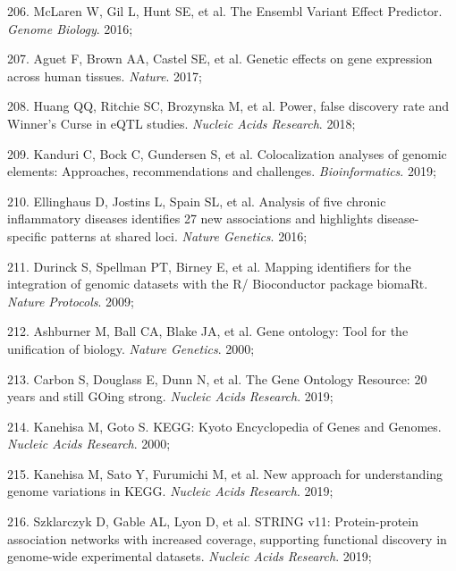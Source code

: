 \documentclass[11pt,oneside]{bristolthesis}
\newenvironment{cslreferences}%
  {}%
  {\par}
\begin{document}
\begin{cslreferences}
\leavevmode\hypertarget{ref-McLaren2016}{}%
206. McLaren W, Gil L, Hunt SE, et al. The Ensembl Variant Effect Predictor. \emph{Genome Biology}. 2016;

\leavevmode\hypertarget{ref-Aguet2017}{}%
207. Aguet F, Brown AA, Castel SE, et al. Genetic effects on gene expression across human tissues. \emph{Nature}. 2017;

\leavevmode\hypertarget{ref-Huang2018}{}%
208. Huang QQ, Ritchie SC, Brozynska M, et al. Power, false discovery rate and Winner's Curse in eQTL studies. \emph{Nucleic Acids Research}. 2018;

\leavevmode\hypertarget{ref-Kanduri2019}{}%
209. Kanduri C, Bock C, Gundersen S, et al. Colocalization analyses of genomic elements: Approaches, recommendations and challenges. \emph{Bioinformatics}. 2019;

\leavevmode\hypertarget{ref-Ellinghaus2016}{}%
210. Ellinghaus D, Jostins L, Spain SL, et al. Analysis of five chronic inflammatory diseases identifies 27 new associations and highlights disease-specific patterns at shared loci. \emph{Nature Genetics}. 2016;

\leavevmode\hypertarget{ref-Durinck2009}{}%
211. Durinck S, Spellman PT, Birney E, et al. Mapping identifiers for the integration of genomic datasets with the R/ Bioconductor package biomaRt. \emph{Nature Protocols}. 2009;

\leavevmode\hypertarget{ref-Ashburner2000}{}%
212. Ashburner M, Ball CA, Blake JA, et al. Gene ontology: Tool for the unification of biology. \emph{Nature Genetics}. 2000;

\leavevmode\hypertarget{ref-Carbon2019}{}%
213. Carbon S, Douglass E, Dunn N, et al. The Gene Ontology Resource: 20 years and still GOing strong. \emph{Nucleic Acids Research}. 2019;

\leavevmode\hypertarget{ref-Kanehisa2000}{}%
214. Kanehisa M, Goto S. KEGG: Kyoto Encyclopedia of Genes and Genomes. \emph{Nucleic Acids Research}. 2000;

\leavevmode\hypertarget{ref-Kanehisa2019}{}%
215. Kanehisa M, Sato Y, Furumichi M, et al. New approach for understanding genome variations in KEGG. \emph{Nucleic Acids Research}. 2019;

\leavevmode\hypertarget{ref-Szklarczyk2019}{}%
216. Szklarczyk D, Gable AL, Lyon D, et al. STRING v11: Protein-protein association networks with increased coverage, supporting functional discovery in genome-wide experimental datasets. \emph{Nucleic Acids Research}. 2019;


\end{cslreferences}
\end{document}

